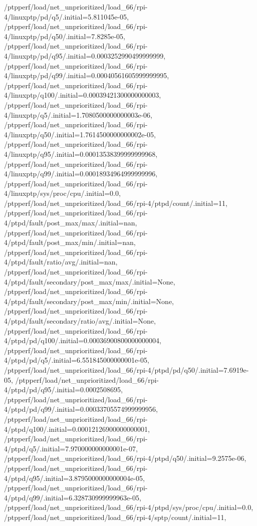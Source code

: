 {    /ptpperf/load/net_unprioritized/load_66/rpi-4/linuxptp/pd/q5/.initial=5.811045e-05,
    /ptpperf/load/net_unprioritized/load_66/rpi-4/linuxptp/pd/q50/.initial=7.8285e-05,
    /ptpperf/load/net_unprioritized/load_66/rpi-4/linuxptp/pd/q95/.initial=0.0003252990499999999,
    /ptpperf/load/net_unprioritized/load_66/rpi-4/linuxptp/pd/q99/.initial=0.00040561605999999995,
    /ptpperf/load/net_unprioritized/load_66/rpi-4/linuxptp/q100/.initial=0.00039421300000000003,
    /ptpperf/load/net_unprioritized/load_66/rpi-4/linuxptp/q5/.initial=1.7080500000000003e-06,
    /ptpperf/load/net_unprioritized/load_66/rpi-4/linuxptp/q50/.initial=1.7614500000000002e-05,
    /ptpperf/load/net_unprioritized/load_66/rpi-4/linuxptp/q95/.initial=0.00013538399999999968,
    /ptpperf/load/net_unprioritized/load_66/rpi-4/linuxptp/q99/.initial=0.00018934964999999996,
    /ptpperf/load/net_unprioritized/load_66/rpi-4/linuxptp/sys/proc/cpu/.initial=0.0,
    /ptpperf/load/net_unprioritized/load_66/rpi-4/ptpd/count/.initial=11,
    /ptpperf/load/net_unprioritized/load_66/rpi-4/ptpd/fault/post_max/max/.initial=nan,
    /ptpperf/load/net_unprioritized/load_66/rpi-4/ptpd/fault/post_max/min/.initial=nan,
    /ptpperf/load/net_unprioritized/load_66/rpi-4/ptpd/fault/ratio/avg/.initial=nan,
    /ptpperf/load/net_unprioritized/load_66/rpi-4/ptpd/fault/secondary/post_max/max/.initial=None,
    /ptpperf/load/net_unprioritized/load_66/rpi-4/ptpd/fault/secondary/post_max/min/.initial=None,
    /ptpperf/load/net_unprioritized/load_66/rpi-4/ptpd/fault/secondary/ratio/avg/.initial=None,
    /ptpperf/load/net_unprioritized/load_66/rpi-4/ptpd/pd/q100/.initial=0.00036900800000000004,
    /ptpperf/load/net_unprioritized/load_66/rpi-4/ptpd/pd/q5/.initial=6.551845000000001e-05,
    /ptpperf/load/net_unprioritized/load_66/rpi-4/ptpd/pd/q50/.initial=7.6919e-05,
    /ptpperf/load/net_unprioritized/load_66/rpi-4/ptpd/pd/q95/.initial=0.0002508695,
    /ptpperf/load/net_unprioritized/load_66/rpi-4/ptpd/pd/q99/.initial=0.00033705574999999956,
    /ptpperf/load/net_unprioritized/load_66/rpi-4/ptpd/q100/.initial=0.00012126900000000001,
    /ptpperf/load/net_unprioritized/load_66/rpi-4/ptpd/q5/.initial=7.970000000000001e-07,
    /ptpperf/load/net_unprioritized/load_66/rpi-4/ptpd/q50/.initial=9.2575e-06,
    /ptpperf/load/net_unprioritized/load_66/rpi-4/ptpd/q95/.initial=3.8795000000000004e-05,
    /ptpperf/load/net_unprioritized/load_66/rpi-4/ptpd/q99/.initial=6.328730999999963e-05,
    /ptpperf/load/net_unprioritized/load_66/rpi-4/ptpd/sys/proc/cpu/.initial=0.0,
    /ptpperf/load/net_unprioritized/load_66/rpi-4/sptp/count/.initial=11,
}
